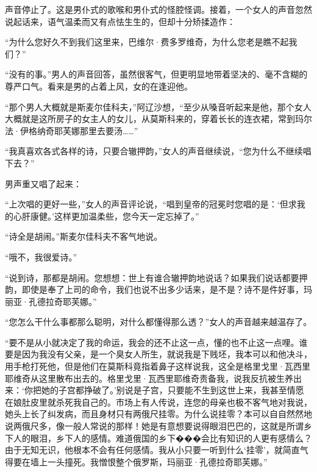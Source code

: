 \par 声音停止了。这是男仆式的歌喉和男仆式的怪腔怪调。接着，一个女人的声音忽然说起话来，语气温柔而又有点怯生生的，但却十分矫揉造作：
\par “为什么您好久不到我们这里来，巴维尔·费多罗维奇，为什么您老是瞧不起我们？”
\par “没有的事。”男人的声音回答，虽然很客气，但更明显地带着坚决的、毫不含糊的尊严口气。看来是男的占着上风，女的在逢迎他。
\par “那个男人大概就是斯麦尔佳科夫，”阿辽沙想，“至少从嗓音听起来是他，那个女人大概就是这所房子的女主人的女儿，从莫斯科来的，穿着长长的连衣裙，常到玛尔法·伊格纳奇耶芙娜那里去要汤……”
\par “我真喜欢各式各样的诗，只要合辙押韵，”女人的声音继续说，“您为什么不继续唱下去？”
\par 男声重又唱了起来：
\par “上次唱的更好一些，”女人的声音评论说，“唱到皇帝的冠冕时您唱的是：‘但求我的心肝康健。’这样更加温柔些，您今天一定忘掉了。”
\par “诗全是胡闹。”斯麦尔佳科夫不客气地说。
\par “哦不，我很爱诗。”
\par “说到诗，那都是胡闹。您想想：世上有谁合辙押韵地说话？如果我们说话都要押韵，即使是奉了上司的命令，我们也说不出多少话来，是不是？诗不是件好事，玛丽亚·孔德拉奇耶芙娜。”
\par “您怎么干什么事都那么聪明，对什么都懂得那么透？”女人的声音越来越温存了。
\par “要不是从小就决定了我的命运，我会的还不止这一点，懂的也不止这一点哩。谁要是因为我没有父亲，是一个臭女人所生，就说我是下贱坯，我本可以和他决斗，用手枪打死他，但是他们在莫斯科竟指着鼻子这样说我，这全是格里戈里·瓦西里耶维奇从这里散布出去的。格里戈里·瓦西里耶维奇责备我，说我反抗被生养出来：‘你把她的子宫都挣破了。’别说是子宫，只要能不生到这世上来，我甚至情愿在娘肚皮里就杀死我自己的。市场上有人传说，连您的母亲也极不客气地对我说，她头上长了纠发病，而且身材只有两俄尺挂零。为什么说挂零？本可以自自然然地说两俄尺多，像一般人常说的那样！她是有意想要说得眼泪巴巴的，这就是所谓乡下人的眼泪，乡下人的感情。难道俄国的乡下���会比有知识的人更有感情么？由于无知无识，他根本不会有任何感情。我从小只要一听到什么‘挂零’，就简直气得要在墙上一头撞死。我憎恨整个俄罗斯，玛丽亚·孔德拉奇耶芙娜。”
